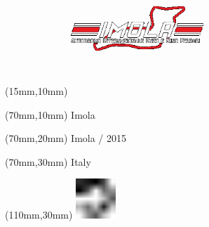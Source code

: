 \null\newpage
\begin{textblock*}{50mm}(15mm,10mm)%
\includegraphics[width=50mm]{LG/IMO.png}
\end{textblock*}
\begin{textblock*}{130mm}(70mm,10mm)%
{\fontsize{20}{20}\selectfont Imola}\\
\end{textblock*}
\begin{textblock*}{120mm}(70mm,20mm)%
{\fontsize{16}{16}\selectfont Imola / 2015}\\
\end{textblock*}
\begin{textblock*}{120mm}(70mm,30mm)%
{\fontsize{12}{12}\selectfont Italy}
\end{textblock*}
\begin{textblock*}{30mm}(110mm,30mm)%
\centering
\includegraphics[height=15mm]{icons/fa-rotate-left.pdf}
\end{textblock*}
